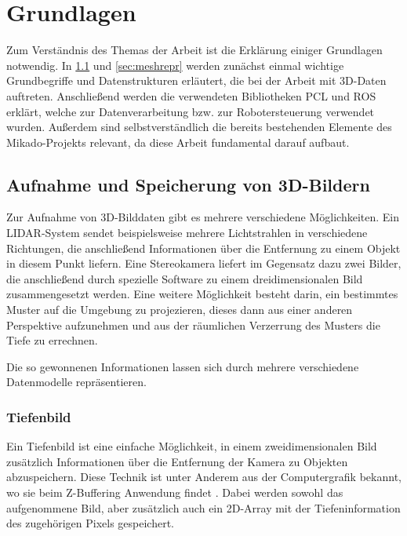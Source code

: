 
\chapter{Grundlagen}
\label{ch:grundlagen}

Zum Verständnis des Themas der Arbeit ist die Erklärung einiger Grundlagen notwendig.
In \ref{sec:3d-bilder} und \ref{sec:meshrepr} werden zunächst einmal wichtige Grundbegriffe und Datenstrukturen erläutert, die bei der Arbeit mit 3D-Daten auftreten.
Anschließend werden die verwendeten Bibliotheken \ac{PCL} und \ac{ROS} erklärt, welche zur Datenverarbeitung bzw. zur Robotersteuerung verwendet wurden.
Außerdem sind selbstverständlich die bereits bestehenden Elemente des Mikado-Projekts relevant, da diese Arbeit fundamental darauf aufbaut.


\section{Aufnahme und Speicherung von 3D-Bildern}
\label{sec:3d-bilder}

Zur Aufnahme von 3D-Bilddaten gibt es mehrere verschiedene Möglichkeiten.
Ein LIDAR-System sendet beispielsweise mehrere Lichtstrahlen in verschiedene Richtungen, die anschließend Informationen über die Entfernung zu einem Objekt in diesem Punkt liefern.
Eine Stereokamera liefert im Gegensatz dazu zwei Bilder, die anschließend durch spezielle Software zu einem dreidimensionalen Bild zusammengesetzt werden.
Eine weitere Möglichkeit besteht darin, ein bestimmtes Muster auf die Umgebung zu projezieren, dieses dann aus einer anderen Perspektive aufzunehmen und aus der räumlichen Verzerrung des Musters die Tiefe zu errechnen.

Die so gewonnenen Informationen lassen sich durch mehrere verschiedene Datenmodelle repräsentieren.


\subsection{Tiefenbild}
\label{subsec:tiefenbild}

Ein Tiefenbild ist eine einfache Möglichkeit, in einem zweidimensionalen Bild zusätzlich Informationen über die Entfernung der Kamera zu Objekten abzuspeichern.
Diese Technik ist unter Anderem aus der Computergrafik bekannt, wo sie beim Z-Buffering Anwendung findet \cite[S.32]{catmull1974subdivision}.
Dabei werden sowohl das aufgenommene Bild, aber zusätzlich auch ein 2D-Array mit der Tiefeninformation des zugehörigen Pixels gespeichert.

